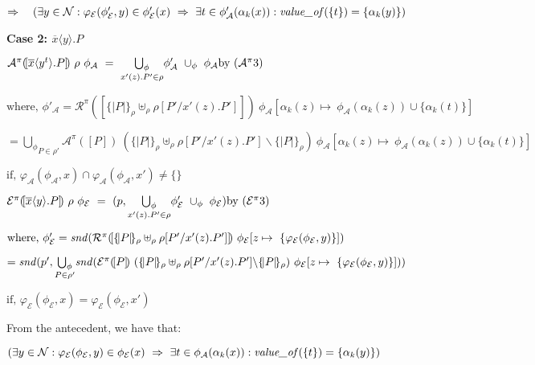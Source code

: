 \documentclass[10pt,a4paper,final,oneside,fleqn]{book}
\begin{document}
\noindent
$\Rightarrow~~~(\exists y\in\mathcal{N}:\varphi_\mathcal{E}(\phi'_\mathcal{E},y)\in\phi'_\mathcal{E}(x)~\Rightarrow~\exists t\in\phi'_\mathcal{A}(\alpha_k(x)):\mbox{{\itshape value\_of\/}}(\{t\})=\{\alpha_k(y)\})$\vspace{5mm}

\noindent
{\bf Case 2: $\overline{x}\langle y\rangle.P$}

\noindent
$\mathcal{A}^\pi(\![\overline{x}\langle y^t\rangle.P]\!)~\rho~\phi_\mathcal{A}~=~\underset{x'(z).P'\in\rho}{\bigcup_\phi}\phi'_\mathcal{A}~\cup_\phi~\phi_\mathcal{A}\hfill\mbox{by }(\mathcal{A}^{\pi}3)$

\noindent
$\mbox{where, }\phi'_\mathcal{A}=\mathcal{R}^\pi(\![\{\!|P|\!\}_\rho\uplus_\rho\rho[P'/x'(z).P']]\!)~\phi_\mathcal{A}[\alpha_k(z)\mapsto~\phi_\mathcal{A}(\alpha_k(z))\cup\{\alpha_k(t)\}]$

\noindent
$=\underset{P\in\rho'}{\bigcup_\phi}\mathcal{A}^\pi(\![P]\!)~(\{\!|P|\!\}_\rho\uplus_\rho\rho[P'/x'(z).P']\backslash\{\!|P|\!\}_\rho)~ \phi_\mathcal{A}[\alpha_k(z)\mapsto~\phi_\mathcal{A}(\alpha_k(z))\cup\{\alpha_k(t)\}]$

\noindent
$\mbox{if, }\varphi_\mathcal{A}(\phi_\mathcal{A},x)\cap\varphi_\mathcal{A}(\phi_\mathcal{A},x')\ne\{\}$\vspace{5mm}

\noindent
$\mathcal{E}^\pi(\![\overline{x}\langle y\rangle.P]\!)~\rho~\phi_\mathcal{E}~=~(p,\underset{x'(z).P'\in\rho}{\bigcup_\phi}\phi'_\mathcal{E}~\cup_\phi~\phi_\mathcal{E})\hfill\mbox{by }(\mathcal{E}^{\pi}3)$

\noindent
$\mbox{where, }\phi'_\mathcal{E}=\mbox{{\itshape snd\/}}(\mathcal{R}^\pi(\![\{\!|P|\!\}_\rho\uplus_\rho\rho[P'/x'(z).P']]\!)~\phi_\mathcal{E}[z\mapsto~\{\varphi_\mathcal{E}(\phi_\mathcal{E},y)\}])$

\noindent
$=\mbox{{\itshape snd\/}}(p',\underset{P\in\rho'}{\bigcup_\phi}\mbox{{\itshape snd\/}}(\mathcal{E}^\pi(\![P]\!)~(\{\!|P|\!\}_\rho\uplus_\rho\rho[P'/x'(z).P']\backslash\{\!|P|\!\}_\rho)~\phi_\mathcal{E}[z\mapsto~\{\varphi_\mathcal{E}(\phi_\mathcal{E},y)\}]))$

\noindent
$\mbox{if, }\varphi_\mathcal{E}(\phi_\mathcal{E},x)=\varphi_\mathcal{E}(\phi_\mathcal{E},x')$\vspace{5mm}

\noindent
From the antecedent, we have that:

\noindent
$(\exists y\in\mathcal{N}:\varphi_\mathcal{E}(\phi_\mathcal{E},y)\in\phi_\mathcal{E}(x)~\Rightarrow~\exists t\in\phi_\mathcal{A}(\alpha_k(x)):\mbox{{\itshape value\_of\/}}(\{t\})=\{\alpha_k(y)\})$\vspace{5mm}
\end{document}
